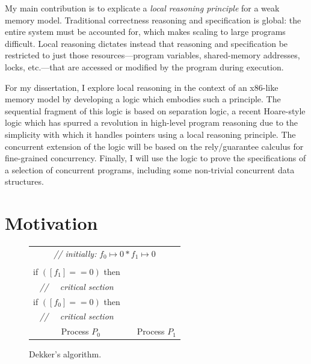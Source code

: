\documentclass[11pt]{article}
\begin{document}
My main contribution is to explicate a \emph{local reasoning principle} for a weak memory model. Traditional correctness reasoning and specification is global: the entire system must be accounted for, which makes scaling to large programs difficult. Local reasoning dictates instead that reasoning and specification be restricted to just those resources---program variables, shared-memory addresses, locks, etc.---that are accessed or modified by the program during execution.

For my dissertation, I explore local reasoning in the context of an x86-like memory model by developing a logic which embodies such a principle. The sequential fragment of this logic is based on separation logic, a recent Hoare-style logic which has spurred a revolution in high-level program reasoning due to the simplicity with which it handles pointers using a local reasoning principle. The concurrent extension of the logic will be based on the rely/guarantee calculus for fine-grained concurrency. Finally, I will use the logic to prove the specifications of a selection of concurrent programs, including some non-trivial concurrent data structures.


\section{Motivation}

\begin{figure}[h]
\centering
\begin{tabular}{cc||cc}
  \multicolumn{4}{c}{\textit{// initially:} $f_0 \mapsto 0 * f_1 \mapsto
  0$}\vspace{0.5em}\\

  \begin{minipage}{0.25\textwidth}
    $\left[f_0\right] := 1;$ \\
    if $(\left[f_1\right] == 0)$ then\\
    \textit{// ~~critical section}
  \end{minipage} & \hspace{0.5cm} & \hspace{0.5cm} &
  \begin{minipage}{0.25\textwidth}
    $\left[f_1\right] := 1;$ \\
    if $(\left[f_0\right] == 0)$ then\\
    \textit{// ~~critical section}
  \end{minipage}\vspace{1em}\\
  \multicolumn{2}{c}{Process $P_0$} & \multicolumn{2}{c}{Process
  $P_1$}\\
\end{tabular}
\caption{\label{fig:dekker} Dekker's algorithm.}
\end{figure}
\end{document}

